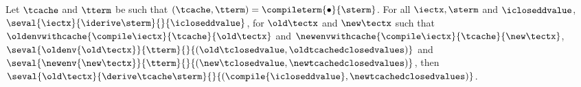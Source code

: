 \begin{theorem}
  \label{thm:soundness-compiled-changesfinal}
  Let $\tcache$ and $\tterm$ be such that 
  $(\tcache, \tterm) = \compileterm{\bullet}{\sterm}$.
  For all $\iectx, \sterm$ and $\icloseddvalue$,
  $\seval{\iectx}{\iderive\sterm}{}{\icloseddvalue}$,
  for $\old\tectx$ and $\new\tectx$ such that
  $\oldenvwithcache{\compile\iectx}{\tcache}{\old\tectx}$
  and $\newenvwithcache{\compile\iectx}{\tcache}{\new\tectx}$,
  $\seval{\oldenv{\old\tectx}}{\tterm}{}{(\old\tclosedvalue, \oldtcachedclosedvalues)}$ and
  $\seval{\newenv{\new\tectx}}{\tterm}{}{(\new\tclosedvalue, \newtcachedclosedvalues)}$,
  then
  $
  \seval{\old\tectx}{\derive\tcache\sterm}{}{(\compile{\icloseddvalue}, \newtcachedclosedvalues)}
  $.
\end{theorem}
